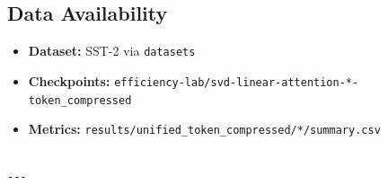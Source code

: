 \subsection{Data Availability}

\begin{itemize}
\item \textbf{Dataset:} SST-2 via \texttt{datasets}
\item \textbf{Checkpoints:} \texttt{efficiency-lab/svd-linear-attention-*-token\_compressed}
\item \textbf{Metrics:} \texttt{results/unified\_token\_compressed/*/summary.csv}
\end{itemize}
\begin{lstlisting}

---
\end{lstlisting}